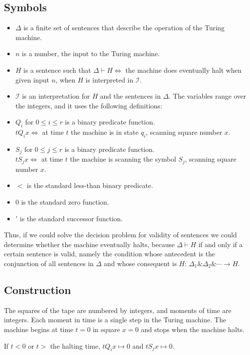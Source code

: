 \subsection{Symbols}
\begin{itemize}
\item $\Delta$ is a finite set of sentences that describe the operation of the Turing machine.
\item $n$ is a number, the input to the Turing machine.
\item $H$ is a sentence such that $\Delta\vdash H\iff$ the machine does eventually halt when given input $n$, when $H$ is interpreted in $\mathscr{I}$.
\item $\mathscr{I}$ is an interpretation for $H$ and the sentences in $\Delta$. The variables range over the integers, and it uses the following definitions:
\item $Q_i$ for $0 \le i \le r$ is a binary predicate function.\\
$t Q_i x \iff $ at time $t$ the machine is in state $q_i$, scanning square number $x$.
\item $S_j$ for $0\le j\le r$ is a binary predicate function.\\
$t S_j x \iff $ at time $t$ the machine is scanning the symbol $S_j$, scanning square number $x$.
\item $<$ is the standard less-than binary predicate.
\item $0$ is the standard zero function.
\item $'$ is the standard successor function.
\end{itemize}

Thus, if we could solve the decision problem for validity of sentences we could determine whether the machine eventually halts, because $\Delta\vdash H$ if and only if a certain sentence is valid, namely the condition whose antecedent is the conjunction of all sentences in $\Delta$ and whose consequent is $H$: $\Delta_1 \& \Delta_2 \& \cdots \rightarrow H$.

\subsection{Construction}
The squares of the tape are numbered by integers, and moments of time are integers. Each moment in time is a single step in the Turing machine. The machine begins at time $t=0$ in square $x=0$ and stops when the machine halts. 

If $t<0$ or $t>$ the halting time, $tQ_ix \mapsto 0$ and $tS_jx\mapsto 0$.

